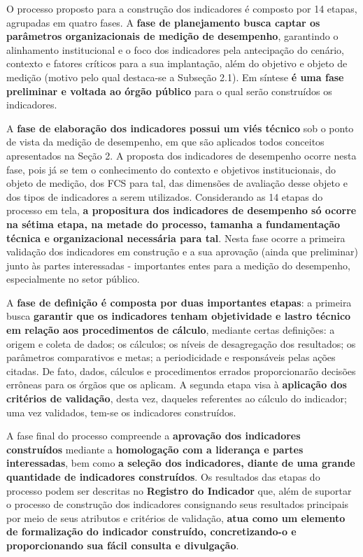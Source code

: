 \documentclass[
  letterpaper,
  DIV=11,
  numbers=noendperiod]{scrreprt}
\begin{document}
O processo proposto para a construção dos indicadores é composto por 14
etapas, agrupadas em quatro fases. A \textbf{fase de planejamento busca
captar os parâmetros organizacionais de medição de desempenho},
garantindo o alinhamento institucional e o foco dos indicadores pela
antecipação do cenário, contexto e fatores críticos para a sua
implantação, além do objetivo e objeto de medição (motivo pelo qual
destaca-se a Subseção 2.1). Em síntese \textbf{é uma fase preliminar e
voltada ao órgão público} para o qual serão construídos os indicadores.

A \textbf{fase de elaboração dos indicadores possui um viés técnico} sob
o ponto de vista da medição de desempenho, em que são aplicados todos
conceitos apresentados na Seção 2. A proposta dos indicadores de
desempenho ocorre nesta fase, pois já se tem o conhecimento do contexto
e objetivos institucionais, do objeto de medição, dos FCS para tal, das
dimensões de avaliação desse objeto e dos tipos de indicadores a serem
utilizados. Considerando as 14 etapas do processo em tela, \textbf{a
propositura dos indicadores de desempenho só ocorre na sétima etapa, na
metade do processo, tamanha a fundamentação técnica e organizacional
necessária para tal}. Nesta fase ocorre a primeira validação dos
indicadores em construção e a sua aprovação (ainda que preliminar) junto
às partes interessadas - importantes entes para a medição do desempenho,
especialmente no setor público.

A \textbf{fase de definição é composta por duas importantes etapas}: a
primeira busca \textbf{garantir que os indicadores tenham objetividade e
lastro técnico em relação aos procedimentos de cálculo}, mediante certas
definições: a origem e coleta de dados; os cálculos; os níveis de
desagregação dos resultados; os parâmetros comparativos e metas; a
periodicidade e responsáveis pelas ações citadas. De fato, dados,
cálculos e procedimentos errados proporcionarão decisões errôneas para
os órgãos que os aplicam. A segunda etapa visa à \textbf{aplicação dos
critérios de validação}, desta vez, daqueles referentes ao cálculo do
indicador; uma vez validados, tem-se os indicadores construídos.

A fase final do processo compreende a \textbf{aprovação dos indicadores
construídos} mediante a \textbf{homologação com a liderança e partes
interessadas}, bem como \textbf{a seleção dos indicadores, diante de uma
grande quantidade de indicadores construídos}. Os resultados das etapas
do processo podem ser descritas no \textbf{Registro do Indicador} que,
além de suportar o processo de construção dos indicadores consignando
seus resultados principais por meio de seus atributos e critérios de
validação, \textbf{atua como um elemento de formalização do indicador
construído, concretizando-o e proporcionando sua fácil consulta e
divulgação}.
\end{document}
